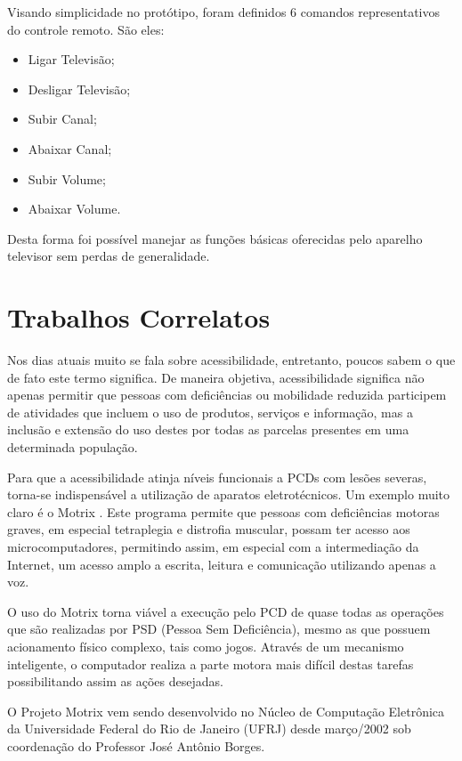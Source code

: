 \documentclass[12pt,a4paper,oneside]{report}
\begin{document}
Visando simplicidade no protótipo, foram definidos 6 comandos representativos do controle remoto. São eles:
\begin{itemize}
    \item Ligar Televisão;
    \item Desligar Televisão;
    \item Subir Canal;
    \item Abaixar Canal;
    \item Subir Volume;
    \item Abaixar Volume.
\end{itemize}

Desta forma foi possível manejar as funções básicas oferecidas pelo aparelho televisor sem perdas de generalidade.

\chapter{Trabalhos Correlatos}
\label{chap:trabalhos-correlatos}

Nos dias atuais muito se fala sobre acessibilidade, entretanto, poucos sabem o que de fato este termo significa. De maneira objetiva, acessibilidade significa não apenas permitir que pessoas com deficiências ou mobilidade reduzida participem de atividades que incluem o uso de produtos, serviços e informação, mas a inclusão e extensão do uso destes por todas as parcelas presentes em uma determinada população.

Para que a acessibilidade atinja níveis funcionais a PCDs com lesões severas, torna-se indispensável a utilização de aparatos eletrotécnicos. Um exemplo muito claro é o Motrix \cite{motrix}. Este programa permite que pessoas com deficiências motoras graves, em especial tetraplegia e distrofia muscular, possam ter acesso aos microcomputadores, permitindo assim, em especial com a intermediação da Internet, um acesso amplo a escrita, leitura e comunicação utilizando apenas a voz.

O uso do Motrix torna viável a execução pelo PCD de quase todas as operações que são realizadas por PSD (Pessoa Sem Deficiência), mesmo as que possuem acionamento físico complexo, tais como jogos. Através de um mecanismo inteligente, o computador realiza a parte motora mais difícil destas tarefas possibilitando assim as ações desejadas.

O Projeto Motrix vem sendo desenvolvido no Núcleo de Computação Eletrônica da Universidade Federal do Rio de Janeiro (UFRJ) desde março/2002 sob coordenação do Professor José Antônio Borges.
\end{document}
